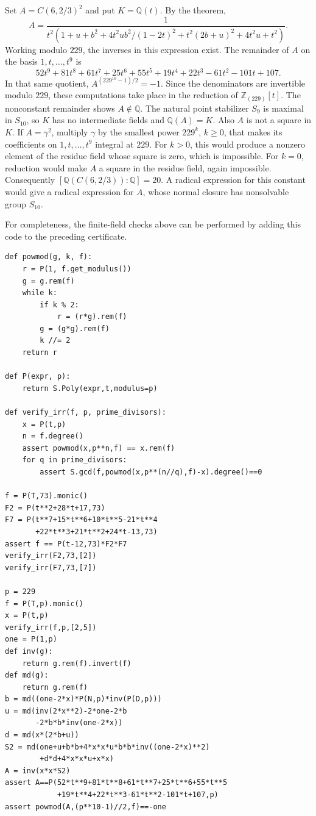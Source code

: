 \documentclass[11pt]{article}
\begin{document}
Set \(A=C(6,2/3)^2\) and put \(K=\mathbb Q(t)\).
By the theorem,
\[
 A=\frac{1}{t^2\left(1+u+b^2+
           4t^2ub^2/(1-2t)^2+t^2(2b+u)^2+4t^2u+t^2\right)}.
\]
Working modulo \(229\), the inverses in this expression exist.
The remainder of \(A\) on the basis \(1,t,\ldots,t^9\) is
\[
 52t^9+81t^8+61t^7+25t^6+55t^5+19t^4
       +22t^3-61t^2-101t+107.
\]
In that same quotient, \(A^{(229^{10}-1)/2}=-1\).
Since the denominators are invertible modulo \(229\), these
computations take place in the reduction of
\(\mathbb Z_{(229)}[t]\). The nonconstant remainder shows
\(A\notin\mathbb Q\). The natural point stabilizer \(S_9\) is
maximal in \(S_{10}\), so \(K\) has no intermediate fields and
\(\mathbb Q(A)=K\). Also \(A\) is not a square in \(K\).
If \(A=\gamma^2\), multiply \(\gamma\) by the smallest power
\(229^k\), \(k\ge0\), that makes its coefficients on
\(1,t,\ldots,t^9\) integral at \(229\). For \(k>0\), this would
produce a nonzero element of the residue field whose square is
zero, which is impossible. For \(k=0\), reduction would make
\(A\) a square in the residue field, again impossible.
Consequently \([\mathbb Q(C(6,2/3)):\mathbb Q]=20\). A radical
expression for this constant would give a radical expression
for \(A\), whose normal closure has nonsolvable group \(S_{10}\).

For completeness, the finite-field checks above can be performed
by adding this code to the preceding certificate.
\begin{verbatim}
def powmod(g, k, f):
    r = P(1, f.get_modulus())
    g = g.rem(f)
    while k:
        if k % 2:
            r = (r*g).rem(f)
        g = (g*g).rem(f)
        k //= 2
    return r

def P(expr, p):
    return S.Poly(expr,t,modulus=p)

def verify_irr(f, p, prime_divisors):
    x = P(t,p)
    n = f.degree()
    assert powmod(x,p**n,f) == x.rem(f)
    for q in prime_divisors:
        assert S.gcd(f,powmod(x,p**(n//q),f)-x).degree()==0

f = P(T,73).monic()
F2 = P(t**2+28*t+17,73)
F7 = P(t**7+15*t**6+10*t**5-21*t**4
       +22*t**3+21*t**2+24*t-13,73)
assert f == P(t-12,73)*F2*F7
verify_irr(F2,73,[2])
verify_irr(F7,73,[7])

p = 229
f = P(T,p).monic()
x = P(t,p)
verify_irr(f,p,[2,5])
one = P(1,p)
def inv(g):
    return g.rem(f).invert(f)
def md(g):
    return g.rem(f)
b = md((one-2*x)*P(N,p)*inv(P(D,p)))
u = md(inv(2*x**2)-2*one-2*b
       -2*b*b*inv(one-2*x))
d = md(x*(2*b+u))
S2 = md(one+u+b*b+4*x*x*u*b*b*inv((one-2*x)**2)
        +d*d+4*x*x*u+x*x)
A = inv(x*x*S2)
assert A==P(52*t**9+81*t**8+61*t**7+25*t**6+55*t**5
            +19*t**4+22*t**3-61*t**2-101*t+107,p)
assert powmod(A,(p**10-1)//2,f)==-one
\end{verbatim}
\end{document}
